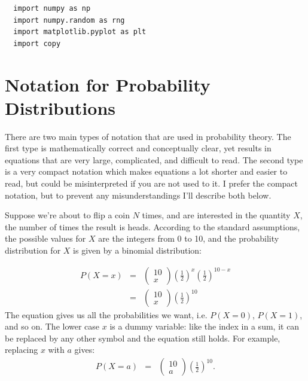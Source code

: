 \begin{verbatim}
  import numpy as np
  import numpy.random as rng
  import matplotlib.pyplot as plt
  import copy
\end{verbatim}

\section{Notation for Probability Distributions}
There are two main types of notation that are used in probability theory. The
first type is mathematically correct and conceptually
clear, yet results in equations that are very large, complicated,
and difficult to read.
The second type is a very compact notation which makes equations a lot
shorter and easier to read, but could be misinterpreted if you are not used to
it. I prefer the compact notation, but to prevent any misunderstandings
I'll describe both below.

Suppose we're about to flip a coin $N$ times, and are interested in the
quantity $X$, the number of times the result is heads. According
to the standard assumptions, the possible values for $X$ are the integers from 0
to 10, and the probability distribution for $X$ is given by
a binomial distribution:

\begin{eqnarray}
P(X = x) &=& \left(\begin{array}{cc}10\\ x\end{array}\right)
\left(\frac{1}{2}\right)^x\left(\frac{1}{2}\right)^{10 - x}\\
&=& \left(\begin{array}{cc}10\\ x\end{array}\right)
\left(\frac{1}{2}\right)^{10}
\end{eqnarray}
The equation gives us all the probabilities we want, i.e. $P(X=0)$, $P(X=1)$,
and so on. The lower case $x$ is a dummy variable: like the index in a sum, it
can be replaced by any other symbol and the equation still holds. For example,
replacing $x$ with $a$ gives:
\begin{eqnarray}
P(X = a) &=& \left(\begin{array}{cc}10\\ a\end{array}\right)
\left(\frac{1}{2}\right)^{10}.
\end{eqnarray}

